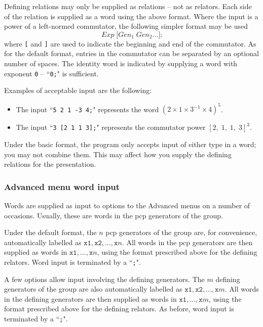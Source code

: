\documentclass[12pt]{article}
\begin{document}
Defining relations may only be supplied as relations -- not as relators.
Each side of the relation is supplied as a word using the above
format. Where the input is a power of a left-normed commutator, the 
following simpler format may be used
\begin{displaymath}
\textit{Exp}\; \texttt{[} \textit{Gen}_1\; \textit{Gen}_2 \ldots \texttt{];}
\end{displaymath}
where \texttt{[} and \texttt{]} are used to indicate the beginning and end
of the commutator. As for the default format, entries in the commutator can
be separated by an optional number of spaces.  
The identity word is indicated by supplying a word with exponent \texttt{0} 
-- ``\texttt{0;}" is sufficient.

Examples of acceptable input are the following:
\begin{itemize}
\item The input ``\texttt{5 2 1 -3 4;}"
represents the word $(2 \times 1 \times 3^{-1} \times 4)^5$.
\item The input ``\texttt{3 [2 1 1 3];}" represents
the commutator power $[2,\; 1,\; 1,\; 3]^3$.
\end{itemize}
Under the basic format, the program only accepts input of 
either type in a word; you may not combine them. This may affect 
how you supply the defining relations for the presentation.

\subsubsection{Advanced menu word input}
Words are supplied as input to options to the Advanced menus
on a number of occasions. Usually,
these are words in the pcp generators of the group.

Under the default format, the $n$ pcp generators of the group
are, for convenience, automatically labelled as 
$\mathtt{x1, x2, \ldots, x}n$.  
All words in the pcp generators are then supplied as words 
in $\mathtt{x1, \ldots, x}n$, using the format prescribed above 
for the defining relators. Word input is terminated by a ``\texttt{;}". 

A few options allow input involving the defining generators.
The $m$ defining generators of the group are also automatically 
labelled as $\mathtt{x1, x2, \ldots, x}m$.  All words in the defining 
generators are then supplied as words in $\mathtt{x1, \ldots, x}m$, 
using the format prescribed above for the defining relators. 
As before, word input is terminated by a ``\texttt{;}". 
\end{document}
